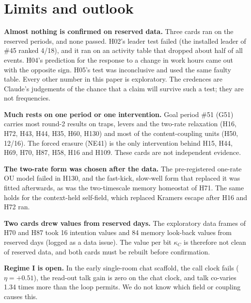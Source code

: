 \section{Limits and outlook}\label{sec:limits}

\textbf{Almost nothing is confirmed on reserved data.} Three cards ran on the reserved periods, and none passed. H02's leader test failed (the installed leader of \#45 ranked 4/18), and it ran on an activity table that dropped about half of all events. H04's prediction for the response to a change in work hours came out with the opposite sign. H05's test was inconclusive and used the same faulty table. Every other number in this paper is exploratory. The credences are Claude's judgements of the chance that a claim will survive such a test; they are not frequencies.

\textbf{Much rests on one period or one intervention.} Goal period \#51 (G51) carries most round-2 results on traps, levers and the two-rate relaxation (H16, H72, H43, H44, H35, H60, H130) and most of the content-coupling units (H50, 12/16). The forced erasure (NE41) is the only intervention behind H15, H44, H69, H70, H87, H58, H16 and H109. These cards are not independent evidence.

\textbf{The two-rate form was chosen after the data.} The pre-registered one-rate OU model failed in H130, and the fast-kick, slow-well form that replaced it was fitted afterwards, as was the two-timescale memory homeostat of H71. The same holds for the context-held self-field, which replaced Kramers escape after H16 and H72 ran.

\textbf{Two cards drew values from reserved days.} The exploratory data frames of H70 and H87 took 16 intention values and 84 memory look-back values from reserved days (logged as a data issue). The value per bit $\kappa_C$ is therefore not clean of reserved data, and both cards must be rebuilt before confirmation.

\textbf{Regime I is open.} In the early single-room chat scaffold, the call clock fails ($\eta=+0.51$), the read-out talk gain is zero on the chat clock, and talk co-varies 1.34 times more than the loop permits. We do not know which field or coupling causes this.

